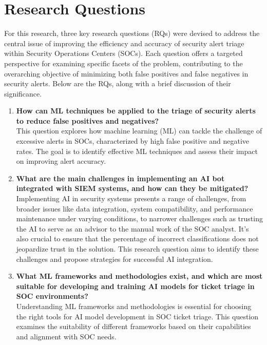 \section{Research Questions}

For this research, three key research questions (RQs) were devised to address the central issue of improving the efficiency and accuracy of security alert triage within Security Operations Centers (SOCs). 
Each question offers a targeted perspective for examining specific facets of the problem, contributing to the overarching objective of minimizing both false positives and false negatives in security alerts. 
Below are the RQs, along with a brief discussion of their significance.

\begin{enumerate}
    \item \textbf{How can ML techniques be applied to the triage of security alerts to reduce false positives and negatives?} \\
    This question explores how machine learning (ML) can tackle the challenge of excessive alerts in SOCs, characterized by high false positive and negative rates. The goal is to identify effective ML techniques and assess their impact on improving alert accuracy.
    
    \item \textbf{What are the main challenges in implementing an AI bot integrated with SIEM systems, and how can they be mitigated?} \\
    Implementing AI in security systems presents a range of challenges, from broader issues like data integration, system compatibility, and performance maintenance under varying conditions, to narrower challenges such as trusting the AI to serve as an advisor to the manual work of the SOC analyst. It's also crucial to ensure that the percentage of incorrect classifications does not jeopardize trust in the solution. This research question aims to identify these challenges and propose strategies for successful AI integration.
        
    \item \textbf{What ML frameworks and methodologies exist, and which are most suitable for developing and training AI models for ticket triage in SOC environments?} \\
    Understanding ML frameworks and methodologies is essential for choosing the right tools for AI model development in SOC ticket triage. This question examines the suitability of different frameworks based on their capabilities and alignment with SOC needs.
\end{enumerate}

